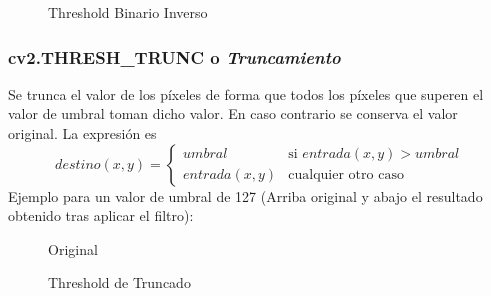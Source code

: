 \begin{figure}[H]
  \centering \setlength\fboxsep{0pt} \setlength\fboxrule{0.5pt}
  \caption{Threshold Binario Inverso}
\end{figure}


\subsubsection{cv2.THRESH\_TRUNC o \emph{Truncamiento}}
Se trunca el valor de los píxeles de forma que todos los píxeles que
superen el valor de umbral toman dicho valor. En caso contrario se
conserva el valor original. La expresión es
\begin{equation*}
  destino(x, y) =
  \begin{cases}
    umbral & \text{si } entrada(x, y) > umbral \\
    entrada(x, y) & \text{cualquier otro caso}
  \end{cases}
\end{equation*}
Ejemplo para un valor de umbral de 127 (Arriba original y abajo el
resultado obtenido tras aplicar el filtro):

\begin{figure}[H]
  \caption{Original}
  \centering \setlength\fboxsep{0pt} \setlength\fboxrule{0.5pt}
\end{figure}

\begin{figure}[H]
  \centering \setlength\fboxsep{0pt} \setlength\fboxrule{0.5pt}
  \caption{Threshold de Truncado}
\end{figure}


